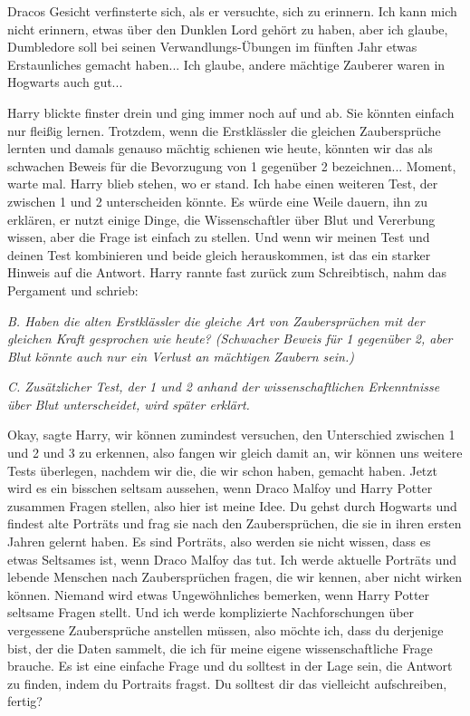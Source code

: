 Dracos Gesicht verfinsterte sich, als er versuchte, sich zu erinnern. \glqq{}Ich
kann mich nicht erinnern, etwas über den Dunklen Lord gehört zu haben, aber ich
glaube, Dumbledore soll bei seinen Verwandlungs-Übungen im fünften Jahr etwas
Erstaunliches gemacht haben... Ich glaube, andere mächtige Zauberer waren in
Hogwarts auch gut...\grqq{}

Harry blickte finster drein und ging immer noch auf und ab. \glqq{}Sie könnten
einfach nur fleißig lernen. Trotzdem, wenn die Erstklässler die gleichen
Zaubersprüche lernten und damals genauso mächtig schienen wie heute, könnten wir
das als schwachen Beweis für die Bevorzugung von 1 gegenüber 2 bezeichnen...
Moment, warte mal.\grqq{} Harry blieb stehen, wo er stand. \glqq{}Ich habe einen
weiteren Test, der zwischen 1 und 2 unterscheiden könnte. Es würde eine Weile
dauern, ihn zu erklären, er nutzt einige Dinge, die Wissenschaftler über Blut
und Vererbung wissen, aber die Frage ist einfach zu stellen. Und wenn wir meinen
Test und deinen Test kombinieren und beide gleich herauskommen, ist das ein
starker Hinweis auf die Antwort.\grqq{} Harry rannte fast zurück zum
Schreibtisch, nahm das Pergament und schrieb:

\emph{B. Haben die alten Erstklässler die gleiche Art von Zaubersprüchen mit der
gleichen Kraft gesprochen wie heute? (Schwacher Beweis für 1 gegenüber 2, aber
Blut könnte auch nur ein Verlust an mächtigen Zaubern sein.)}

\emph{C. Zusätzlicher Test, der 1 und 2 anhand der wissenschaftlichen
Erkenntnisse über Blut unterscheidet, wird später erklärt.}

\glqq{}Okay\grqq{}, sagte Harry, \glqq{}wir können zumindest versuchen, den
Unterschied zwischen 1 und 2 und 3 zu erkennen, also fangen wir gleich damit an,
wir können uns weitere Tests überlegen, nachdem wir die, die wir schon haben,
gemacht haben. Jetzt wird es ein bisschen seltsam aussehen, wenn Draco Malfoy
und Harry Potter zusammen Fragen stellen, also hier ist meine Idee. Du gehst
durch Hogwarts und findest alte Porträts und frag sie nach den Zaubersprüchen,
die sie in ihren ersten Jahren gelernt haben. Es sind Porträts, also werden sie
nicht wissen, dass es etwas Seltsames ist, wenn Draco Malfoy das tut. Ich werde
aktuelle Porträts und lebende Menschen nach Zaubersprüchen fragen, die wir
kennen, aber nicht wirken können. Niemand wird etwas Ungewöhnliches bemerken,
wenn Harry Potter seltsame Fragen stellt. Und ich werde komplizierte
Nachforschungen über vergessene Zaubersprüche anstellen müssen, also möchte ich,
dass du derjenige bist, der die Daten sammelt, die ich für meine eigene
wissenschaftliche Frage brauche. Es ist eine einfache Frage und du solltest in
der Lage sein, die Antwort zu finden, indem du Portraits fragst. Du solltest dir
das vielleicht aufschreiben, fertig?\grqq{}

